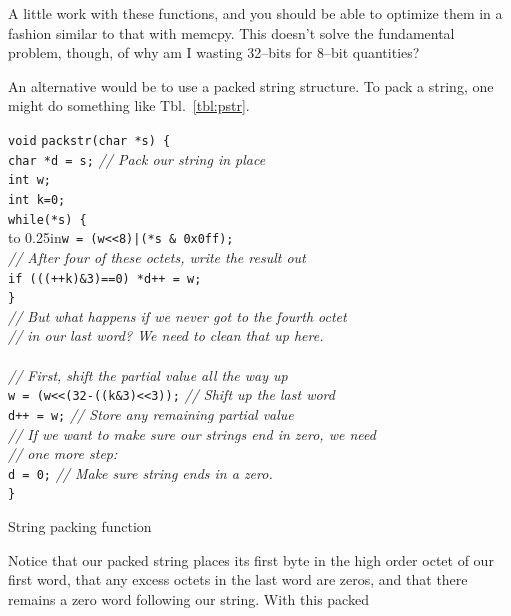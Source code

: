 \documentclass{gqtekspec}
\begin{document}
A little work with these functions, and you should be able to optimize them
in a fashion similar to that with memcpy.  This doesn't solve the fundamental
problem, though, of why am I wasting 32--bits for 8--bit quantities?

An alternative would be to use a packed string structure.  To pack a string,
one might do something like Tbl.~\ref{tbl:pstr}.
\begin{table}\begin{center}
\begin{tabbing}
{\tt void} \= {\tt packstr(char *s) \{} \\
	\> {\tt char *d = s;} \= {\em // Pack our string in place} \\
	\> {\tt int w;} \\
	\> {\tt int k=0;} \\
	\> {\tt while(*s) \{} \\
	\> \hbox to 0.25in{}\={\tt w = (w<<8)|(*s \& 0x0ff);} \\
	\>\> {\em // After four of these octets, write the result out} \\
	\> \> {\tt if (((++k)\&3)==0) *d++ = w;} \\
	\> {\tt \}} \\
	\> {\em // But what happens if we never got to the fourth octet}\\
	\> {\em // in our last word?  We need to clean that up here.}\\
\\
	\> {\em // First, shift the partial value all the way up}\\
	\> {\tt w = (w<<(32-((k\&3)<<3));} {\em // Shift up the last word}\\
	\> {\tt *d++ = w;} {\em // Store any remaining partial value }\\
	\> {\em // If we want to make sure our strings end in zero, we need}\\
	\> {\em // one more step:}\\
	\> {\tt *d = 0;} {\em // Make sure string ends in a zero.}\\
{\tt \}}
\end{tabbing}
\caption{String packing function}\label{tbl:pstr}
\end{center}\end{table}
Notice that our packed string places its first byte in the high order octet
of our first word, that any excess octets in the last word are zeros,
and that there remains a zero word following our string.  With this packed
\end{document}
